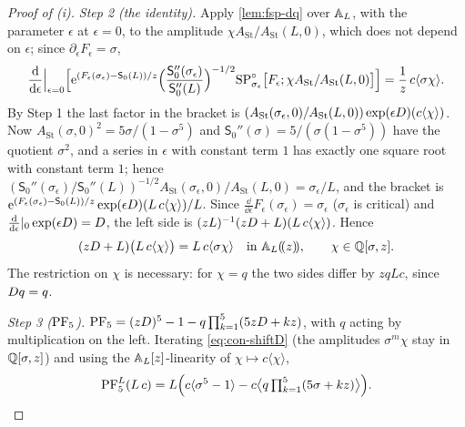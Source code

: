 \begin{proof}[Proof of (i)]
\emph{Step 2 (the identity).} Apply \cref{lem:fsp-dq} over $\mathbb{A}_{L}$, with the parameter $\epsilon$ at $\epsilon=0$, to the amplitude $\chi A_{\mathrm{St}}/A_{\mathrm{St}}(L,0)$, which does not depend on $\epsilon$; since $\partial_\epsilon F_\epsilon=\sigma$,
\[
\frac{\mathrm{d}}{\mathrm{d}\epsilon}\Big|_{\epsilon=0}\Bigl[\mathrm{e}^{(F_\epsilon(\sigma_\epsilon)-\mathsf S_0(L))/z}\Bigl(\frac{\mathsf S_0''(\sigma_\epsilon)}{\mathsf S_0''(L)}\Bigr)^{-1/2}\mathrm{SP}^{\circ}_{\sigma_\epsilon}\bigl[F_\epsilon;\chi A_{\mathrm{St}}/A_{\mathrm{St}}(L,0)\bigr]\Bigr]=\frac1z\,c\langle\sigma\chi\rangle .
\]
By Step 1 the last factor in the bracket is $(A_{\mathrm{St}}(\sigma_\epsilon,0)/A_{\mathrm{St}}(L,0))\exp(\epsilon D)(c\langle\chi\rangle)$. Now $A_{\mathrm{St}}(\sigma,0)^2=5\sigma/(1-\sigma^5)$ and $\mathsf S_0''(\sigma)=5/(\sigma(1-\sigma^5))$ have the quotient $\sigma^2$, and a series in $\epsilon$ with constant term $1$ has exactly one square root with constant term $1$; hence $(\mathsf S_0''(\sigma_\epsilon)/\mathsf S_0''(L))^{-1/2}A_{\mathrm{St}}(\sigma_\epsilon,0)/A_{\mathrm{St}}(L,0)=\sigma_\epsilon/L$, and the bracket is $\mathrm{e}^{(F_\epsilon(\sigma_\epsilon)-\mathsf S_0(L))/z}\exp(\epsilon D)(L\,c\langle\chi\rangle)/L$. Since $\frac{\dd}{\dd\epsilon}F_\epsilon(\sigma_\epsilon)=\sigma_\epsilon$ ($\sigma_\epsilon$ is critical) and $\frac{\mathrm{d}}{\mathrm{d}\epsilon}|_{0}\exp(\epsilon D)=D$, the left side is $(zL)^{-1}(zD+L)(L\,c\langle\chi\rangle)$. Hence
\begin{equation}
\label{eq:con-shiftD}
(zD+L)\bigl(L\,c\langle\chi\rangle\bigr)=L\,c\langle\sigma\chi\rangle\quad\text{in }\mathbb{A}_{L}(\!(z)\!),\qquad\chi\in\mathbb{Q}[\sigma,z].
\end{equation}
The restriction on $\chi$ is necessary: for $\chi=q$ the two sides differ by $zqLc$, since $D q=q$.

\emph{Step 3 ($\mathrm{PF}_{5}$).} $\mathrm{PF}_{5}=(zD)^5-1-q\prod_{k=1}^5(5zD+kz)$, with $q$ acting by multiplication on the left. Iterating \eqref{eq:con-shiftD} (the amplitudes $\sigma^m\chi$ stay in $\mathbb{Q}[\sigma,z]$) and using the $\mathbb{A}_{L}[z]$-linearity of $\chi\mapsto c\langle\chi\rangle$,
\[
\mathrm{PF}_{5}^{L}(L\,c)=L\Bigl(c\langle\sigma^5-1\rangle-c\bigl\langle q\textstyle\prod_{k=1}^5(5\sigma+kz)\bigr\rangle\Bigr).
\]


\end{proof}
